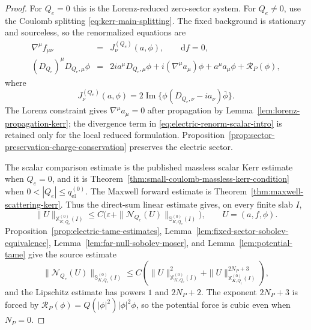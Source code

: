 \documentclass[11pt]{article}
\numberwithin{equation}{section}
\theoremstyle{plain}
\theoremstyle{definition}
\theoremstyle{remark}
\newcommand{\dd}{\mathrm{d}}
\begin{document}
\begin{proof}
For \(Q_e=0\) this is the Lorenz-reduced zero-sector system.  For \(Q_e\ne0\), use the Coulomb splitting \eqref{eq:kerr-main-splitting}.  The fixed background is stationary and sourceless, so the renormalized equations are
\begin{eqnarray}
 \nabla^\mu f_{\mu\nu} &=& J^{(Q_e)}_\nu(a,\phi),
 \qquad \dd f=0,
 \label{eq:electric-renorm-maxwell-intro}\\
 (D_{Q_e})^\mu D_{Q_e,\mu}\phi
 &=&2ia^\mu D_{Q_e,\mu}\phi+i(\nabla^\mu a_\mu)\phi
      +a^\mu a_\mu\phi+\mathcal R_P(\phi),
 \label{eq:electric-renorm-scalar-intro}
\end{eqnarray}
where
\begin{equation}\label{eq:kerr-main-current}
 J^{(Q_e)}_\nu(a,\phi)=2\operatorname{Im}\{\phi (D_{Q_e,\nu}-ia_\nu)\overline{\phi}\}.
\end{equation}
The Lorenz constraint gives \(\nabla^\mu a_\mu=0\) after propagation by Lemma~\ref{lem:lorenz-propagation-kerr}; the divergence term in \eqref{eq:electric-renorm-scalar-intro} is retained only for the local reduced formulation.  Proposition~\ref{prop:sector-preservation-charge-conservation} preserves the electric sector.

The scalar comparison estimate is the published massless scalar Kerr estimate when \(Q_e=0\), and it is Theorem~\ref{thm:small-coulomb-massless-kerr-condition} when \(0<|Q_e|\le q_{\mathrm{el}}^{(0)}\).  The Maxwell forward estimate is Theorem~\ref{thm:maxwell-scattering-kerr}.  Thus the direct-sum linear estimate gives, on every finite slab \(I\),
\begin{equation}\label{eq:kerr-main-linear-bound}
 \|U\|_{\mathbb X_{K,Q_e}^{(0)}(I)}
 \le C\bigl(\varepsilon+
 \|\mathcal N_{Q_e}(U)\|_{\mathbb S_{K,Q_e}^{(0)}(I)}\bigr),
 \qquad U=(a,f,\phi).
\end{equation}
Proposition~\ref{prop:electric-tame-estimates}, Lemma~\ref{lem:fixed-sector-sobolev-equivalence}, Lemma~\ref{lem:far-null-sobolev-moser}, and Lemma~\ref{lem:potential-tame} give the source estimate
\begin{equation}\label{eq:kerr-main-source-bound}
 \|\mathcal N_{Q_e}(U)\|_{\mathbb S_{K,Q_e}^{(0)}(I)}
 \le C\left(\|U\|_{\mathbb X_{K,Q_e}^{(0)}(I)}^2+
          \|U\|_{\mathbb X_{K,Q_e}^{(0)}(I)}^{2N_P+3}\right),
\end{equation}
and the Lipschitz estimate has powers \(1\) and \(2N_P+2\).  The exponent \(2N_P+3\) is forced by \(\mathcal R_P(\phi)=Q(|\phi|^2)|\phi|^2\phi\), so the potential force is cubic even when \(N_P=0\).


\end{proof}
\end{document}
